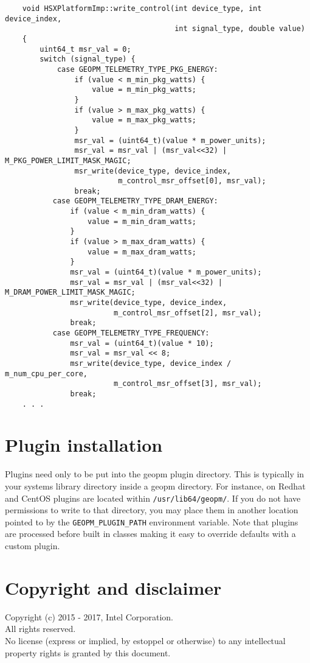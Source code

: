 \documentclass[11pt]{article}
\begin{document}
\begin{verbatim}
    void HSXPlatformImp::write_control(int device_type, int device_index,
                                       int signal_type, double value)
    {
        uint64_t msr_val = 0;
        switch (signal_type) {
            case GEOPM_TELEMETRY_TYPE_PKG_ENERGY:
                if (value < m_min_pkg_watts) {
                    value = m_min_pkg_watts;
                }
                if (value > m_max_pkg_watts) {
                    value = m_max_pkg_watts;
                }
                msr_val = (uint64_t)(value * m_power_units);
                msr_val = msr_val | (msr_val<<32) | M_PKG_POWER_LIMIT_MASK_MAGIC;
                msr_write(device_type, device_index,
                          m_control_msr_offset[0], msr_val);
                break;
           case GEOPM_TELEMETRY_TYPE_DRAM_ENERGY:
               if (value < m_min_dram_watts) {
                   value = m_min_dram_watts;
               }
               if (value > m_max_dram_watts) {
                   value = m_max_dram_watts;
               }
               msr_val = (uint64_t)(value * m_power_units);
               msr_val = msr_val | (msr_val<<32) | M_DRAM_POWER_LIMIT_MASK_MAGIC;
               msr_write(device_type, device_index,
                         m_control_msr_offset[2], msr_val);
               break;
           case GEOPM_TELEMETRY_TYPE_FREQUENCY:
               msr_val = (uint64_t)(value * 10);
               msr_val = msr_val << 8;
               msr_write(device_type, device_index / m_num_cpu_per_core,
                         m_control_msr_offset[3], msr_val);
               break;
    . . .
\end{verbatim}

\section{Plugin installation}
Plugins need only to be put into the geopm plugin directory. This is
typically in your systems library directory inside a geopm
directory. For instance, on Redhat and CentOS plugins are located
within \verb#/usr/lib64/geopm/#. If you do not have permissions to
write to that directory, you may place them in another location
pointed to by the \verb#GEOPM_PLUGIN_PATH# environment variable.  Note
that plugins are processed before built in classes making it easy to
override defaults with a custom plugin.

\section{Copyright and disclaimer}
Copyright (c) 2015 - 2017, Intel Corporation.
\\
All rights reserved.
\\
No license (express or implied, by estoppel or otherwise) to any
intellectual property rights is granted by this document.

%
%
%
\end{document}

